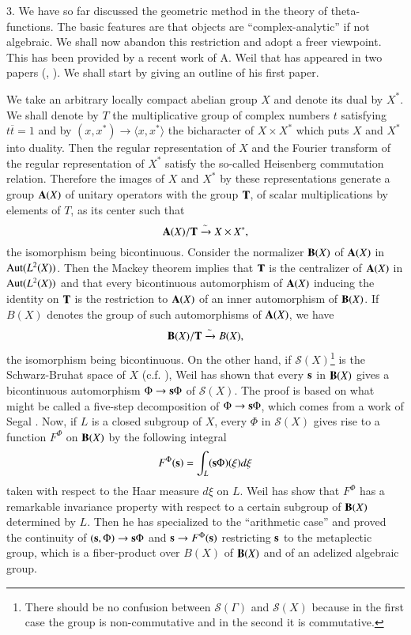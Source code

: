 3. We have so far discussed the geometric method in the theory of theta-functions. The basic features are that objects are ``complex-analytic'' if not algebraic. We shall now abandon this restriction and adopt a freer viewpoint. This has been provided by a recent work of A. Weil that has appeared in two papers (\cite{art12-key25}, \cite{art12-key26}). We shall start by giving an outline of his first paper.

We take an arbitrary locally compact abelian group $X$ and denote its dual by $X^{*}$. We shall denote by $T$ the multiplicative group of complex numbers $t$ satisfying $t\overline{t}=1$ and by $(x,x^{*})\to \langle x,x^{*}\rangle$ the bicharacter of $X\times X^{*}$ which puts $X$ and $X^{*}$ into duality. Then the regular representation of $X$ and the Fourier transform of the regular representation of $X^{*}$ satisfy the so-called Heisenberg commutation relation. Therefore the images of $X$ and $X^{*}$ by these representations generate a group $\mathbf{A}(X)$ of unitary operators with the group $\mathbf{T}$, of scalar multiplications by elements of $T$, as its center such that
$$
\mathbf{A}(X)/\mathbf{T}\xrightarrow{\sim} X\times X^{*},
$$\pageoriginale
the isomorphism being bicontinuous. Consider the normalizer $\mathbf{B}(X)$ of $\mathbf{A}(X)$ in $\operatorname{\mathrm{Aut}} (L^{2}(X))$. Then the Mackey theorem \cite{art12-key15} implies that $\mathbf{T}$ is the centralizer of $\mathbf{A}(X)$ in $\operatorname{\mathrm{Aut}} (L^{2}(X))$ and that every bicontinuous automorphism of $\mathbf{A}(X)$ inducing the identity on $\mathbf{T}$ is the restriction to $\mathbf{A}(X)$ of an inner automorphism of $\mathbf{B}(X)$. If $B(X)$ denotes the group of such automorphisms of $\mathbf{A}(X)$, we have
$$
\mathbf{B}(X)/\mathbf{T}\xrightarrow{\sim} B(X),
$$
the isomorphism being bicontinuous. On the other hand, if $\mathscr{S}(X)$\footnote{There should be no confusion between $\mathscr{S}(\Gamma)$ and $\mathscr{S}(X)$ because in the first case the group is non-commutative and in the second it is commutative.} is the Schwarz-Bruhat space of $X$ (c.f. \cite{art12-key3}), Weil has shown that every $\mathbf{s}$ in $\mathbf{B}(X)$ gives a bicontinuous automorphism $\Phi\to \mathbf{s}\Phi$ of $\mathscr{S}(X)$. The proof is based on what might be called a five-step decomposition of $\Phi\to \mathbf{s}\Phi$, which comes from a work of Segal \cite{art12-key20}. Now, if $L$ is a closed subgroup of $X$, every $\Phi$ in $\mathscr{S}(X)$ gives rise to a function $F^{\Phi}$ on $\mathbf{B}(X)$ by the following integral
$$
F^{\Phi}(\mathbf{s})=\int_{L}(\mathbf{s}\Phi)(\xi)d\xi
$$
taken with respect to the Haar measure $d\xi$ on $L$. Weil has show that $F^{\Phi}$ has a remarkable invariance property with respect to a certain subgroup of $\mathbf{B}(X)$ determined by $L$. Then he has specialized to the ``arithmetic case'' and proved the continuity of $(\mathbf{s},\Phi)\to \mathbf{s}\Phi$ and $\mathbf{s}\to F^{\Phi}(\mathbf{s})$ restricting $\mathbf{s}$ to the metaplectic group, which is a fiber-product over $B(X)$ of $\mathbf{B}(X)$ and of an adelized algebraic group.

